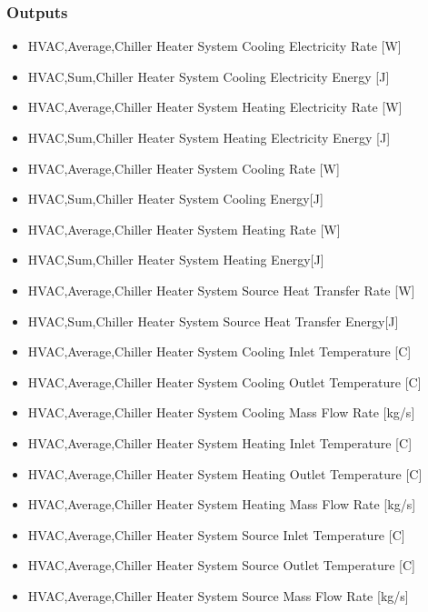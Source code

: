 \subsubsection{Outputs}\label{outputs-17-000}

\begin{itemize}
    \item
    HVAC,Average,Chiller Heater System Cooling Electricity Rate {[}W{]}
    \item
    HVAC,Sum,Chiller Heater System Cooling Electricity Energy {[}J{]}
    \item
    HVAC,Average,Chiller Heater System Heating Electricity Rate {[}W{]}
    \item
    HVAC,Sum,Chiller Heater System Heating Electricity Energy {[}J{]}
    \item
    HVAC,Average,Chiller Heater System Cooling Rate {[}W{]}
    \item
    HVAC,Sum,Chiller Heater System Cooling Energy{[}J{]}
    \item
    HVAC,Average,Chiller Heater System Heating Rate {[}W{]}
    \item
    HVAC,Sum,Chiller Heater System Heating Energy{[}J{]}
    \item
    HVAC,Average,Chiller Heater System Source Heat Transfer Rate {[}W{]}
    \item
    HVAC,Sum,Chiller Heater System Source Heat Transfer Energy{[}J{]}
    \item
    HVAC,Average,Chiller Heater System Cooling Inlet Temperature {[}C{]}
    \item
    HVAC,Average,Chiller Heater System Cooling Outlet Temperature {[}C{]}
    \item
    HVAC,Average,Chiller Heater System Cooling Mass Flow Rate {[}kg/s{]}
    \item
    HVAC,Average,Chiller Heater System Heating Inlet Temperature {[}C{]}
    \item
    HVAC,Average,Chiller Heater System Heating Outlet Temperature {[}C{]}
    \item
    HVAC,Average,Chiller Heater System Heating Mass Flow Rate {[}kg/s{]}
    \item
    HVAC,Average,Chiller Heater System Source Inlet Temperature {[}C{]}
    \item
    HVAC,Average,Chiller Heater System Source Outlet Temperature {[}C{]}
    \item
    HVAC,Average,Chiller Heater System Source Mass Flow Rate {[}kg/s{]}
\end{itemize}

